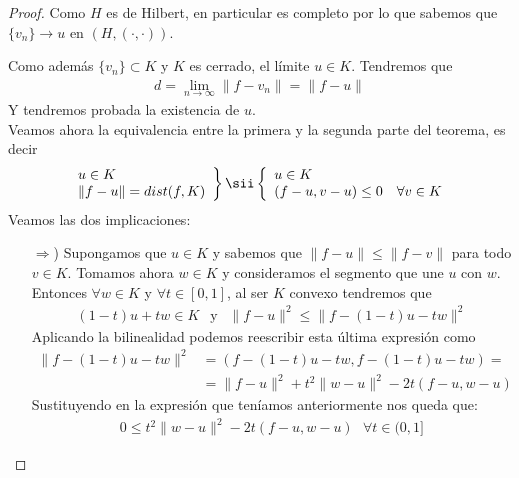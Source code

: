 \begin{teo}
\begin{proof}
        Como $H$ es de Hilbert, en particular es completo por lo que sabemos que $\{v_n\}\to u$ en $(H, (\cdot, \cdot))$.

        Como además $\{v_n\}\subset K$ y $K$ es cerrado, el límite $u\in K$. Tendremos que
        \begin{gather*}
            d = \lim_{n\to \infty} \|f-v_n\| = \|f-u\|
        \end{gather*}
        Y tendremos probada la existencia de $u$.\\

        Veamos ahora la equivalencia entre la primera y la segunda parte del teorema, es decir
        \begin{gather*}
            \left.
            \begin{array}{l}
                u\in K\\
                \|f-u\|=dist(f,K)
            \end{array}
            \right\} \sii
            \left\{
            \begin{array}{l}
                u\in K\\
                (f-u, v-u)\leq 0$ \ \ $\forall v \in K
            \end{array}
            \right.
        \end{gather*}
        Veamos las dos implicaciones:
        \begin{itemize}
            \item[$\Rightarrow$)] Supongamos que $u\in K$ y sabemos que $\|f-u\|\leq \|f-v\|$ para todo $v\in K$. Tomamos ahora $w\in K$ y consideramos el segmento que une $u$ con $w$. Entonces $\forall w\in K$ y $\forall t \in [0,1]$, al ser $K$ convexo tendremos que
            \begin{gather*}
                (1-t)u + tw \in K\ \  \text{ y }\ \ \|f-u\|^2 \leq \|f-(1-t)u-tw\|^2
            \end{gather*}
            Aplicando la bilinealidad podemos reescribir esta última expresión como 
            \begin{align*}
                \|f-(1-t)u-tw\|^2 &= (f-(1-t)u-tw,f-(1-t)u-tw) =\\
                &=\|f-u\|^2 + t^2\|w-u\|^2-2t(f-u,w-u)
            \end{align*}
            Sustituyendo en la expresión que teníamos anteriormente nos queda que:
            \begin{gather*}
                0\leq t^2\|w-u\|^2-2t(f-u,w-u) \ \ \ \forall t \in (0,1]
            \end{gather*}

\end{itemize}
\end{proof}
\end{teo}
